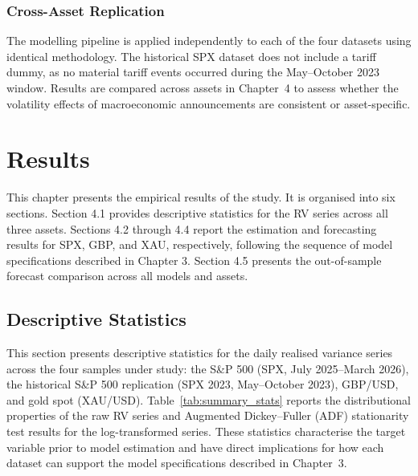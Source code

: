 \documentclass[12pt,a4paper]{report}
\begin{document}
\subsection{Cross-Asset Replication}
The modelling pipeline is applied independently to each of the four datasets using identical methodology. The historical SPX dataset does not include a tariff dummy, as no material tariff events occurred during the May--October 2023 window. Results are compared across assets in Chapter~4 to assess whether the volatility effects of macroeconomic announcements are consistent or asset-specific.

\chapter{Results}
This chapter presents the empirical results of the study. It is organised into six sections. Section 4.1 provides descriptive statistics for the RV series across all three assets. Sections 4.2 through 4.4 report the estimation and forecasting results for SPX, GBP, and XAU, respectively, following the sequence of model specifications described in Chapter 3. Section 4.5 presents the out-of-sample forecast comparison across all models and assets.

\section{Descriptive Statistics}

This section presents descriptive statistics for the daily realised variance series across the four samples under study: the S\&P 500 (SPX, July 2025--March 2026), the historical S\&P 500 replication (SPX 2023, May--October 2023), GBP/USD, and gold spot (XAU/USD). Table~\ref{tab:summary_stats} reports the distributional properties of the raw RV series and Augmented Dickey--Fuller (ADF) stationarity test results for the log-transformed series. These statistics characterise the target variable prior to model estimation and have direct implications for how each dataset can support the model specifications described in Chapter~3.
\end{document}
